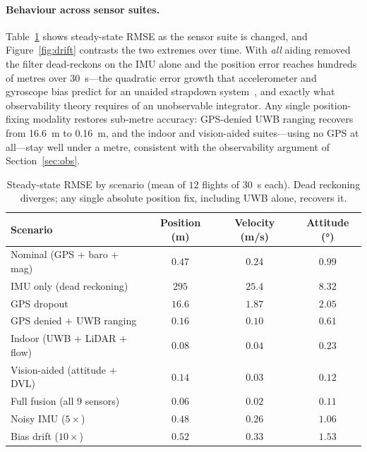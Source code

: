 \documentclass[11pt]{article}
\begin{document}
\paragraph{Behaviour across sensor suites.}
Table~\ref{tab:scenarios} shows steady-state RMSE as the sensor suite is changed, and
Figure~\ref{fig:drift} contrasts the two extremes over time. With \emph{all} aiding removed the filter
dead-reckons on the IMU alone and the position error reaches hundreds of metres over
\SI{30}{\second}---the quadratic error growth that accelerometer and gyroscope bias predict for an
unaided strapdown system~\cite{groves2013,titterton2004}, and exactly what observability theory
requires of an unobservable integrator. Any single position-fixing modality restores sub-metre accuracy:
GPS-denied UWB ranging recovers from \SI{16.6}{\metre} to \SI{0.16}{\metre}, and the indoor and
vision-aided suites---using no GPS at all---stay well under a metre, consistent with the observability
argument of Section~\ref{sec:obs}.

\begin{table}[t]
  \centering
  \begin{tabular}{lccc}
    \toprule
    Scenario & Position (m) & Velocity (m/s) & Attitude (\si{\degree}) \\
    \midrule
    Nominal (GPS + baro + mag)         & $0.47$      & $0.24$  & $0.99$ \\
    IMU only (dead reckoning)          & $295$       & $25.4$  & $8.32$ \\
    GPS dropout                        & $16.6$      & $1.87$  & $2.05$ \\
    GPS denied $+$ UWB ranging         & $0.16$      & $0.10$  & $0.61$ \\
    Indoor (UWB $+$ LiDAR $+$ flow)    & $0.08$      & $0.04$  & $0.23$ \\
    Vision-aided (attitude $+$ DVL)    & $0.14$      & $0.03$  & $0.12$ \\
    Full fusion (all $9$ sensors)      & $0.06$      & $0.02$  & $0.11$ \\
    Noisy IMU ($5\times$)              & $0.48$      & $0.26$  & $1.06$ \\
    Bias drift ($10\times$)            & $0.52$      & $0.33$  & $1.53$ \\
    \bottomrule
  \end{tabular}
  \caption{Steady-state RMSE by scenario (mean of $12$ flights of \SI{30}{\second} each). Dead reckoning
  diverges; any single absolute position fix, including UWB alone, recovers it.}
  \label{tab:scenarios}
\end{table}
\end{document}
